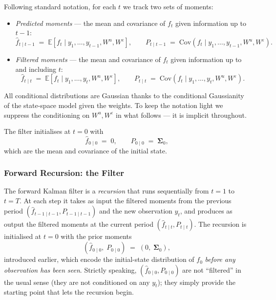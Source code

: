 \documentclass[11pt, a4paper, oneside]{article}
\begin{document}
Following standard notation, for each $t$ we track two sets of moments:

\begin{itemize}[leftmargin=1.5em, itemsep=3pt]
    \item \emph{Predicted moments} — the mean and covariance of $f_t$
          given information up to $t-1$:
          \[
          \hat{f}_{t \mid t-1} \;=\; \mathbb{E}[f_t \mid y_1, \ldots, y_{t-1}, W^{u}, W^{\varepsilon}],
          \qquad
          P_{t \mid t-1} \;=\; \mathrm{Cov}(f_t \mid y_1, \ldots, y_{t-1}, W^{u}, W^{\varepsilon}).
          \]
    \item \emph{Filtered moments} — the mean and covariance of $f_t$
          given information up to and including $t$:
          \[
          \hat{f}_{t \mid t} \;=\; \mathbb{E}[f_t \mid y_1, \ldots, y_t, W^{u}, W^{\varepsilon}],
          \qquad
          P_{t \mid t} \;=\; \mathrm{Cov}(f_t \mid y_1, \ldots, y_t, W^{u}, W^{\varepsilon}).
          \]
\end{itemize}
All conditional distributions are Gaussian thanks to the conditional
Gaussianity of the state-space model given the weights. To keep the
notation light we suppress the conditioning on $W^u, W^\varepsilon$ in
what follows — it is implicit throughout.

The filter initialises at $t = 0$ with
\[
\hat{f}_{0 \mid 0} \;=\; 0, \qquad P_{0 \mid 0} \;=\; \boldsymbol{\Sigma}_0,
\]
which are the mean and covariance of the initial state.

\subsubsection{Forward Recursion: the Filter}

The forward Kalman filter is a \emph{recursion} that runs sequentially
from $t = 1$ to $t = T$. At each step it takes as input the filtered
moments from the previous period $(\hat{f}_{t-1 \mid t-1}, P_{t-1 \mid t-1})$
and the new observation $y_t$, and produces as output the filtered
moments at the current period $(\hat{f}_{t \mid t}, P_{t \mid t})$.
The recursion is initialised at $t = 0$ with the prior moments
\[
(\hat{f}_{0 \mid 0},\; P_{0 \mid 0}) \;=\; (0,\; \boldsymbol{\Sigma}_0),
\]
introduced earlier, which encode the initial-state distribution of
$f_0$ \emph{before any observation has been seen}. Strictly speaking,
$(\hat{f}_{0 \mid 0}, P_{0 \mid 0})$ are not ``filtered'' in the usual
sense (they are not conditioned on any $y_t$); they simply provide
the starting point that lets the recursion begin.
\end{document}
